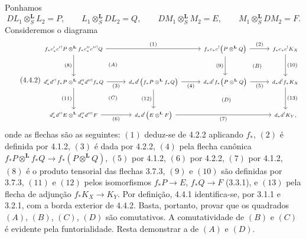 \begin{prooftext}[Demonstração]
Ponhamos
\[
DL_1\otimes_S^{\mathbf L}L_2=P,\qquad
L_1\otimes_S^{\mathbf L}DL_2=Q,\qquad
DM_1\otimes_S^{\mathbf L}M_2=E,\qquad
M_1\otimes_S^{\mathbf L}DM_2=F.
\]
Consideremos o diagrama
\begin{equation}
\tag{4.4.2}
\begin{tikzcd}[column sep=2.6em,row sep=2.6em,cells={nodes={font=\scriptsize}}]
f_*c'_*c'{}^!P\otimes^{\mathbf L} f_*c''_*c''{}^!Q
  \arrow[rr,"(1)"] \arrow[d,"(8)"'] &&
f_*c_*c^!\bigl(P\otimes^{\mathbf L}Q\bigr)
  \arrow[r,"(2)"] \arrow[d,"(9)"'] &
f_*c_*c^!K_X \arrow[d,"(10)"]\\
d'_*d'{}^!f_*P\otimes^{\mathbf L}d''_*d''{}^!f_*Q
  \arrow[r,"(3)"'] \arrow[d,"(11)"'] &
d_*d^!\bigl(f_*P\otimes^{\mathbf L}f_*Q\bigr)
  \arrow[r,"(4)"'] \arrow[d,"(12)"'] &
d_*d^!f_*\bigl(P\otimes^{\mathbf L}Q\bigr)
  \arrow[r,"(5)"'] &
d_*d^!f_*K_X \arrow[d,"(13)"]\\
d'_*d'{}^!E\otimes^{\mathbf L}d''_*d''{}^!F
  \arrow[r,"(6)"'] &
d_*d^!\bigl(E\otimes^{\mathbf L}F\bigr)
  \arrow[rr,"(7)"'] &&
d_*d^!K_Y,
\arrow[from=1-1,to=2-2, phantom, "\scriptstyle (A)"]
\arrow[from=1-3,to=2-4, phantom, "\scriptstyle (B)"]
\arrow[from=2-1,to=3-2, phantom, "\scriptstyle (C)"]
\arrow[from=2-2,to=3-4, phantom, "\scriptstyle (D)"]
\end{tikzcd}
\end{equation}
onde as flechas são as seguintes: $(1)$ deduz-se de 4.2.2 aplicando $f_*$, $(2)$ é definida por 4.1.2, $(3)$ é dada por 4.2.2, $(4)$ pela flecha canônica $f_*P\otimes^{\mathbf L}f_*Q\longrightarrow f_*(P\otimes^{\mathbf L}Q)$, $(5)$ por 4.1.2, $(6)$ por 4.2.2, $(7)$ por 4.1.2, $(8)$ é o produto tensorial das flechas 3.7.3, $(9)$ e $(10)$ são definidas por 3.7.3, $(11)$ e $(12)$ pelos isomorfismos $f_*P\longrightarrow E$, $f_*Q\longrightarrow F$ (3.3.1), e $(13)$ pela flecha de adjunção $f_*K_X\longrightarrow K_Y$. Por definição, 4.4.1 identifica-se, por 3.1.1 e 3.2.1, com a borda exterior de 4.4.2. Basta, portanto, provar que os quadrados $(A)$, $(B)$, $(C)$, $(D)$ são comutativos. A comutatividade de $(B)$ e $(C)$ é evidente pela funtorialidade. Resta demonstrar a de $(A)$ e $(D)$.


\end{prooftext}
